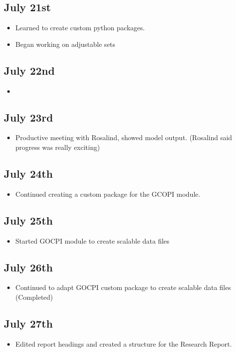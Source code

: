 \documentclass[12pt]{article}
\begin{document}
\subsection*{July 21st}
\begin{itemize}
	\item Learned to create custom python packages.
	\item Began working on adjustable sets
\end{itemize}
\subsection*{July 22nd}
\begin{itemize}
	\item 
\end{itemize}
\subsection*{July 23rd}
\begin{itemize}
	\item Productive meeting with Rosalind, showed model output. (Rosalind said progress was really exciting)
\end{itemize}
\subsection*{July 24th}
\begin{itemize}
	\item Continued creating a custom package for the GCOPI module.
\end{itemize}
\subsection*{July 25th}
\begin{itemize}
	\item Started GOCPI module to create scalable data files
\end{itemize}
\subsection*{July 26th}
\begin{itemize}
	\item Continued to adapt GOCPI custom package to create scalable data files (Completed)
\end{itemize}
\subsection*{July 27th}
\begin{itemize}
	\item Edited report headings and created a structure for the Research Report.
\end{itemize}
\end{document}
